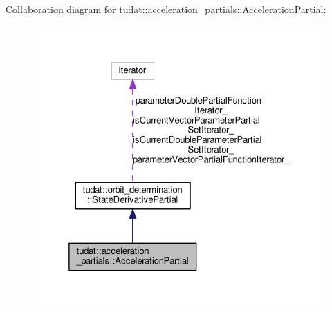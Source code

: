 Collaboration diagram for tudat\+:\+:acceleration\+\_\+partials\+:\+:Acceleration\+Partial\+:
\nopagebreak
\begin{figure}[H]
\begin{center}
\leavevmode
\includegraphics[width=325pt]{classtudat_1_1acceleration__partials_1_1AccelerationPartial__coll__graph}
\end{center}
\end{figure}
